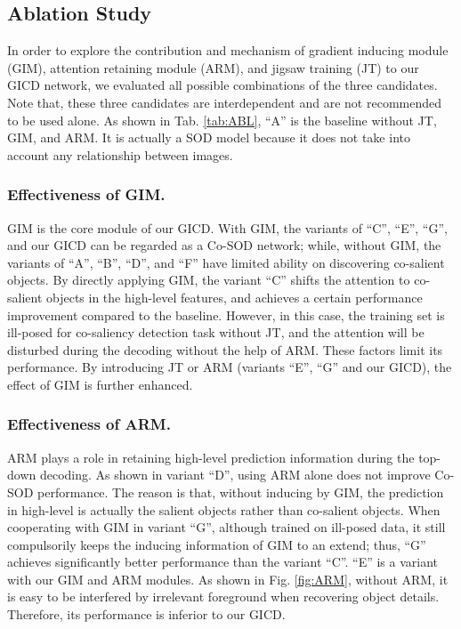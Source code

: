 \documentclass[runningheads,orivec]{llncs}
\newcommand{\tabref}[1]{Tab. \ref{#1}}
\newcommand{\figref}[1]{Fig. \ref{#1}}
\begin{document}
\subsection{Ablation Study}
\label{sec:abl}
In order to explore the contribution and mechanism of gradient inducing module (GIM), attention retaining module (ARM), and jigsaw training (JT) to our GICD network, 
we evaluated all possible combinations of the three candidates.
Note that, 
these three candidates are interdependent and are not recommended to be used alone.
As shown in \tabref{tab:ABL},
``A'' is the baseline without JT, GIM, and ARM.
It is actually a SOD model because it does not take into account any relationship between images.


\subsubsection{Effectiveness of GIM.}
GIM is the core module of our GICD.
With GIM, the variants of ``C'', ``E'', ``G'', and our GICD can be regarded as a Co-SOD network; while, without GIM, the variants of ``A'', ``B'', ``D'', and ``F'' have limited ability on discovering co-salient objects.
By directly applying GIM, the variant ``C'' shifts the attention to co-salient objects in the high-level features, and achieves a certain performance improvement compared to the baseline.
However, in this case, the training set is ill-posed for co-saliency detection task without JT, and the attention will be disturbed during the decoding without the help of ARM.
These factors limit its performance.
By introducing JT or ARM (variants ``E'', ``G'' and our GICD), the effect of GIM is further enhanced.

\subsubsection{Effectiveness of ARM.}
ARM plays a role in retaining high-level prediction information during the top-down decoding.
As shown in variant ``D'', using ARM alone does not improve Co-SOD performance.
The reason is that, without inducing by GIM, the prediction in high-level is actually the salient objects rather than co-salient objects.
When cooperating with GIM in variant ``G'', although trained on ill-posed data, 
it still compulsorily keeps the inducing information of GIM to an extend; thus, ``G'' achieves significantly better performance than the variant ``C''.
``E'' is a variant with our GIM and ARM modules.
As shown in \figref{fig:ARM}, without ARM, it is easy to be interfered by irrelevant foreground when recovering object details.
Therefore, its performance is inferior to our GICD.
\end{document}
